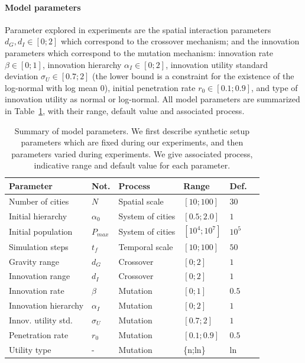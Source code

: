 \documentclass[letterpaper]{article}
\begin{document}
\paragraph{Model parameters}

Parameter explored in experiments are the spatial interaction parameters $d_G,d_I \in \left[0;2\right]$ which correspond to the crossover mechanism; and the innovation parameters which correspond to the mutation mechanism: innovation rate $\beta \in \left[0;1\right]$, innovation hierarchy $\alpha_I \in \left[0;2\right]$, innovation utility standard deviation $\sigma_U \in \left[ 0.7;2\right]$ (the lower bound is a constraint for the existence of the log-normal with log mean 0), initial penetration rate $r_0 \in \left[0.1;0.9\right]$, and type of innovation utility as normal or log-normal. All model parameters are summarized in Table~\ref{tab:params}, with their range, default value and associated process.


\begin{table}
\caption{Summary of model parameters. We first describe synthetic setup parameters which are fixed during our experiments, and then parameters varied during experiments. We give associated process, indicative range and default value for each parameter.\label{tab:params}}
	\hspace{-0.5cm}
	\footnotesize
	\begin{tabular}{|l|l|l|l|l|l|}
	\hline
	Parameter & Not. & Process & Range & Def. \\ \hline
	Number of cities & $N$ & Spatial scale & $[10 ; 100]$ & $30$\\
	Initial hierarchy & $\alpha_0$ & System of cities & $[0.5 ; 2.0]$ & $1$\\
	Initial population & $P_{max}$ & System of cities & $[10^4 ; 10^7]$ & $10^5$\\
	Simulation steps & $t_f$ & Temporal scale & $[10 ; 100]$ & $50$\\\hline
	Gravity range & $d_G$ & Crossover & $[0 ; 2]$ & $1$\\
	Innovation range & $d_I$ & Crossover & $[0 ; 2]$ & $1$\\
	Innovation rate & $\beta$ & Mutation & $[0 ; 1]$ & $0.5$\\
	Innovation hierarchy & $\alpha_I$ & Mutation & $[0 ; 2]$ & $1$\\
	Innov. utility std. & $\sigma_U$ & Mutation & $\left[ 0.7;2\right]$ & $1$\\
	Penetration rate & $r_0$ & Mutation & $\left[0.1;0.9\right]$ & $0.5$\\
	Utility type & - & Mutation & \{n;ln\}& ln \\
	\hline
	\end{tabular}
\end{table}
\end{document}
